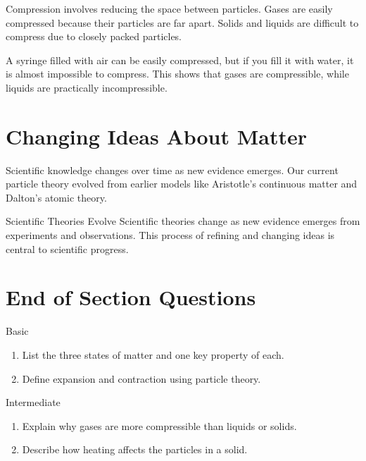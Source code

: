 Compression involves reducing the space between particles. Gases are easily compressed because their particles are far apart. Solids and liquids are difficult to compress due to closely packed particles.

\begin{example}
A syringe filled with air can be easily compressed, but if you fill it with water, it is almost impossible to compress. This shows that gases are compressible, while liquids are practically incompressible.
\end{example}

\section{Changing Ideas About Matter}

Scientific knowledge changes over time as new evidence emerges. Our current particle theory evolved from earlier models like Aristotle’s continuous matter and Dalton’s atomic theory.


\begin{keyconcept}{Scientific Theories Evolve}
Scientific theories change as new evidence emerges from experiments and observations. This process of refining and changing ideas is central to scientific progress.
\end{keyconcept}

\section{End of Section Questions}

\begin{tieredquestions}{Basic}
\begin{enumerate}
    \item List the three states of matter and one key property of each.
    \item Define expansion and contraction using particle theory.
\end{enumerate}
\end{tieredquestions}

\begin{tieredquestions}{Intermediate}
\begin{enumerate}
    \item Explain why gases are more compressible than liquids or solids.
    \item Describe how heating affects the particles in a solid.
\end{enumerate}
\end{tieredquestions}

